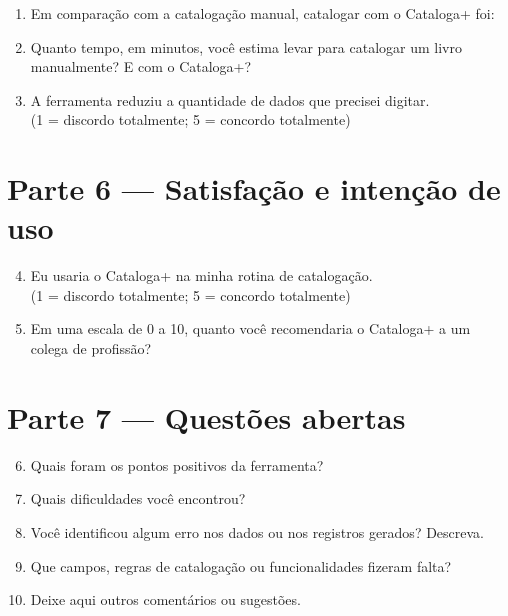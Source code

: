 \begin{enumerate}
    \item Em comparação com a catalogação manual, catalogar com o Cataloga+ foi:\\
    \item Quanto tempo, em minutos, você estima levar para catalogar um livro manualmente? \underline{\hspace{1.5cm}} E com o Cataloga+? \underline{\hspace{1.5cm}}
    \item A ferramenta reduziu a quantidade de dados que precisei digitar.\\
    (1 = discordo totalmente; 5 = concordo totalmente) ~\caixa{}~\caixa{}~\caixa{}~\caixa{}~\caixa
\end{enumerate}

\section*{Parte 6 --- Satisfação e intenção de uso}

\begin{enumerate}
    \setcounter{enumi}{3}
    \item Eu usaria o Cataloga+ na minha rotina de catalogação.\\
    (1 = discordo totalmente; 5 = concordo totalmente) ~\caixa{}~\caixa{}~\caixa{}~\caixa{}~\caixa
    \item Em uma escala de 0 a 10, quanto você recomendaria o Cataloga+ a um colega de profissão? \underline{\hspace{1.5cm}}
\end{enumerate}

\section*{Parte 7 --- Questões abertas}

\begin{enumerate}
    \setcounter{enumi}{5}
    \item Quais foram os pontos positivos da ferramenta?
    \item Quais dificuldades você encontrou?
    \item Você identificou algum erro nos dados ou nos registros gerados? Descreva.
    \item Que campos, regras de catalogação ou funcionalidades fizeram falta?
    \item Deixe aqui outros comentários ou sugestões.
\end{enumerate}
